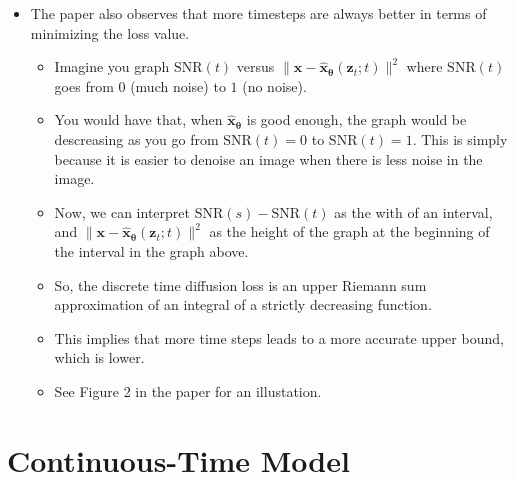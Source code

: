 \documentclass[10pt]{article}
\newcommand{\ve}[1]{\mathbf{#1}}
\newcommand{\ves}[1]{\boldsymbol{#1}}
\newcommand{\SNR}{\mathrm{SNR}}
\begin{document}
\begin{itemize}
  \item The paper also observes that more timesteps are always better in terms of minimizing the loss value.
  \begin{itemize}
    \item Imagine you graph $\SNR(t)$ versus $\| \ve{x} - \hat{\ve{x}}_{\ves{\theta}}(\ve{z}_t;t) \|^2$ where $\SNR(t)$ goes from $0$ (much noise) to $1$ (no noise).
    
    \item You would have that, when $\hat{\ve{x}}_{\ves{\theta}}$ is good enough, the graph would be descreasing as you go from $\SNR(t) = 0$ to $\SNR(t) = 1$. This is simply because it is easier to denoise an image when there is less noise in the image.
    
    \item Now, we can interpret $\SNR(s) - \SNR(t)$ as the with of an interval, and $\| \ve{x} - \hat{\ve{x}}_{\ves{\theta}}(\ve{z}_t;t) \|^2$ as the height of the graph at the beginning of the interval in the graph above.
    
    \item So, the discrete time diffusion loss is an upper Riemann sum approximation of an integral of a strictly decreasing function.
    
    \item This implies that more time steps leads to a more accurate upper bound, which is lower.
    
    \item See Figure 2 in the paper for an illustation.
  \end{itemize} 
\end{itemize}

\section{Continuous-Time Model}
\end{document}
